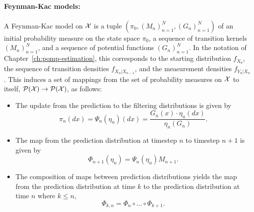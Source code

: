 \paragraph{\bf Feynman-Kac models:} A Feynman-Kac model on ${\mathcal{X}}$ is a tuple $(\pi_0, (M_n)_{n=1}^N, (G_n)_{n=1}^N)$ of an initial probability measure on the state space $\pi_0$, a sequence of transition kernels $(M_n)_{n=1}^N$, and a sequence of potential functions $(G_n)_{n=1}^N$. In the notation of Chapter~\ref{ch:pomp-estimation}, this corresponds to the starting distribution $f_{X_0}$, the sequence of transition densities $f_{X_{n}|X_{n-1}}$, and the measurement densities $f_{Y_n|X_n}$. This induces a set of mappings from the set of probability measures on ${\mathcal{X}}$ to itself, $\mathcal{P}({\mathcal{X}}) \to \mathcal{P}({\mathcal{X}})$, as follows:
\begin{itemize}
    \item The update from the prediction to the filtering distributions is given by 
    \begin{equation}
    \pi_n(dx) = \Psi_n(\eta_n)(dx) = \frac{G_n(x)\cdot\eta_n(dx)}{\eta_n(G_n)}.
    \end{equation}
    \item The map from the prediction distribution at timestep $n$ to timestep $n+1$ is given by 
    \begin{equation}
 \Phi_{n+1}(\eta_n) = \Psi_n(\eta_n) M_{n+1}.       
    \end{equation}
    \item The composition of maps between prediction distributions yields the map from the prediction distribution at time $k$ to the prediction distribution at time $n$ where $k \leq n$,
    \begin{equation}
 \Phi_{k,n} = \Phi_n \circ ... \circ \Phi_{k+1}.       
    \end{equation}
\end{itemize}
